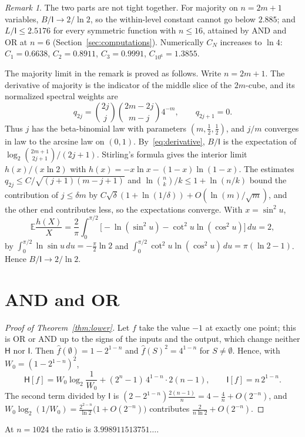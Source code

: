 \documentclass[11pt]{amsart}
\theoremstyle{definition}
\theoremstyle{remark}
\newtheorem{remark}[theorem]{Remark}
\newcommand{\E}{\mathbb E}
\newcommand{\HH}{\mathsf H}
\newcommand{\I}{\mathsf I}
\newcommand{\wh}[1]{\widehat{#1}}
\begin{document}
\begin{remark}
The two parts are not tight together. For majority on $n=2m+1$ variables, $B/\I\to2/\ln2$, so the within-level constant cannot go below $2.885$; and $L/\I\le2.5176$ for every symmetric function with $n\le16$, attained by AND and OR at $n=6$ (Section~\ref{sec:computations}). Numerically $C_N$ increases to $\ln4$: $C_1=0.6638$, $C_2=0.8911$, $C_3=0.9991$, $C_{10^6}=1.3855$.
\end{remark}

The majority limit in the remark is proved as follows. Write $n=2m+1$. The derivative of majority is the indicator of the middle slice of the $2m$-cube, and its normalized spectral weights are
\[
 q_{2j}=\binom{2j}{j}\binom{2m-2j}{m-j}4^{-m},\qquad q_{2j+1}=0.
\]
Thus $j$ has the beta-binomial law with parameters $(m,\tfrac12,\tfrac12)$, and $j/m$ converges in law to the arcsine law on $(0,1)$. By~\eqref{eq:derivative}, $B/\I$ is the expectation of $\log_2\binom{2m+1}{2j+1}/(2j+1)$. Stirling's formula gives the interior limit $h(x)/(x\ln2)$ with $h(x)=-x\ln x-(1-x)\ln(1-x)$. The estimates $q_{2j}\le C/\sqrt{(j+1)(m-j+1)}$ and $\ln\binom nk/k\le1+\ln(n/k)$ bound the contribution of $j\le\delta m$ by $C\sqrt\delta(1+\ln(1/\delta))+O(\ln(m)/\sqrt m)$, and the other end contributes less, so the expectations converge. With $x=\sin^2u$,
\[
 \E\frac{h(X)}X=\frac2\pi\int_0^{\pi/2}\bigl[-\ln(\sin^2u)-\cot^2u\ln(\cos^2u)\bigr]\,du=2,
\]
by $\int_0^{\pi/2}\ln\sin u\,du=-\frac\pi2\ln2$ and $\int_0^{\pi/2}\cot^2u\ln(\cos^2u)\,du=\pi(\ln2-1)$. Hence $B/\I\to2/\ln2$.

\section{AND and OR}\label{sec:lower}

\begin{proof}[Proof of Theorem~\ref{thm:lower}]
Let $f$ take the value $-1$ at exactly one point; this is OR or AND up to the signs of the inputs and the output, which change neither $\HH$ nor $\I$. Then $\wh f(\emptyset)=1-2^{1-n}$ and $\wh f(S)^2=4^{1-n}$ for $S\ne\emptyset$. Hence, with $W_0=(1-2^{1-n})^2$,
\[
 \HH[f]=W_0\log_2\frac1{W_0}+(2^n-1)\,4^{1-n}\cdot2(n-1),\qquad \I[f]=n\,2^{1-n}.
\]
The second term divided by $\I$ is $(2-2^{1-n})\frac{2(n-1)}n=4-\frac4n+O(2^{-n})$, and $W_0\log_2(1/W_0)=\frac{2^{2-n}}{\ln2}\bigl(1+O(2^{-n})\bigr)$ contributes $\frac{2}{n\ln2}+O(2^{-n})$.
\end{proof}

At $n=1024$ the ratio is $3.998911513751\ldots$.
\end{document}
